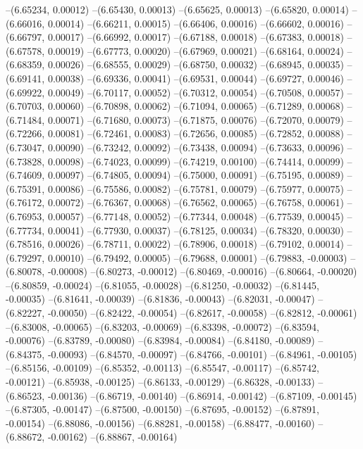 --(6.65234, 0.00012)
--(6.65430, 0.00013)
--(6.65625, 0.00013)
--(6.65820, 0.00014)
--(6.66016, 0.00014)
--(6.66211, 0.00015)
--(6.66406, 0.00016)
--(6.66602, 0.00016)
--(6.66797, 0.00017)
--(6.66992, 0.00017)
--(6.67188, 0.00018)
--(6.67383, 0.00018)
--(6.67578, 0.00019)
--(6.67773, 0.00020)
--(6.67969, 0.00021)
--(6.68164, 0.00024)
--(6.68359, 0.00026)
--(6.68555, 0.00029)
--(6.68750, 0.00032)
--(6.68945, 0.00035)
--(6.69141, 0.00038)
--(6.69336, 0.00041)
--(6.69531, 0.00044)
--(6.69727, 0.00046)
--(6.69922, 0.00049)
--(6.70117, 0.00052)
--(6.70312, 0.00054)
--(6.70508, 0.00057)
--(6.70703, 0.00060)
--(6.70898, 0.00062)
--(6.71094, 0.00065)
--(6.71289, 0.00068)
--(6.71484, 0.00071)
--(6.71680, 0.00073)
--(6.71875, 0.00076)
--(6.72070, 0.00079)
--(6.72266, 0.00081)
--(6.72461, 0.00083)
--(6.72656, 0.00085)
--(6.72852, 0.00088)
--(6.73047, 0.00090)
--(6.73242, 0.00092)
--(6.73438, 0.00094)
--(6.73633, 0.00096)
--(6.73828, 0.00098)
--(6.74023, 0.00099)
--(6.74219, 0.00100)
--(6.74414, 0.00099)
--(6.74609, 0.00097)
--(6.74805, 0.00094)
--(6.75000, 0.00091)
--(6.75195, 0.00089)
--(6.75391, 0.00086)
--(6.75586, 0.00082)
--(6.75781, 0.00079)
--(6.75977, 0.00075)
--(6.76172, 0.00072)
--(6.76367, 0.00068)
--(6.76562, 0.00065)
--(6.76758, 0.00061)
--(6.76953, 0.00057)
--(6.77148, 0.00052)
--(6.77344, 0.00048)
--(6.77539, 0.00045)
--(6.77734, 0.00041)
--(6.77930, 0.00037)
--(6.78125, 0.00034)
--(6.78320, 0.00030)
--(6.78516, 0.00026)
--(6.78711, 0.00022)
--(6.78906, 0.00018)
--(6.79102, 0.00014)
--(6.79297, 0.00010)
--(6.79492, 0.00005)
--(6.79688, 0.00001)
--(6.79883, -0.00003)
--(6.80078, -0.00008)
--(6.80273, -0.00012)
--(6.80469, -0.00016)
--(6.80664, -0.00020)
--(6.80859, -0.00024)
--(6.81055, -0.00028)
--(6.81250, -0.00032)
--(6.81445, -0.00035)
--(6.81641, -0.00039)
--(6.81836, -0.00043)
--(6.82031, -0.00047)
--(6.82227, -0.00050)
--(6.82422, -0.00054)
--(6.82617, -0.00058)
--(6.82812, -0.00061)
--(6.83008, -0.00065)
--(6.83203, -0.00069)
--(6.83398, -0.00072)
--(6.83594, -0.00076)
--(6.83789, -0.00080)
--(6.83984, -0.00084)
--(6.84180, -0.00089)
--(6.84375, -0.00093)
--(6.84570, -0.00097)
--(6.84766, -0.00101)
--(6.84961, -0.00105)
--(6.85156, -0.00109)
--(6.85352, -0.00113)
--(6.85547, -0.00117)
--(6.85742, -0.00121)
--(6.85938, -0.00125)
--(6.86133, -0.00129)
--(6.86328, -0.00133)
--(6.86523, -0.00136)
--(6.86719, -0.00140)
--(6.86914, -0.00142)
--(6.87109, -0.00145)
--(6.87305, -0.00147)
--(6.87500, -0.00150)
--(6.87695, -0.00152)
--(6.87891, -0.00154)
--(6.88086, -0.00156)
--(6.88281, -0.00158)
--(6.88477, -0.00160)
--(6.88672, -0.00162)
--(6.88867, -0.00164)
